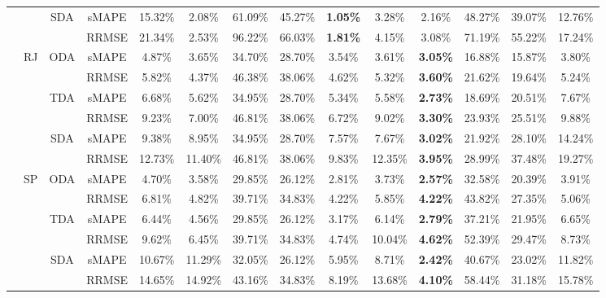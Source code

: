 {\begin{longtable}[htb!]{cccc|ccccc|ccccc}
 &  & {SDA} & sMAPE & 15.32\% & 2.08\% & 61.09\% & 45.27\% & \textbf{1.05\%} & 3.28\% & 2.16\% & 48.27\% & 39.07\% & 12.76\% \\
 &  &  & RRMSE & 21.34\% & 2.53\% & 96.22\% & 66.03\% & \textbf{1.81\%} & 4.15\% & 3.08\% & 71.19\% & 55.22\% & 17.24\% \\ \cline{2-14}
 & {RJ} & {ODA} & sMAPE & 4.87\% & 3.65\% & 34.70\% & 28.70\% & 3.54\% & 3.61\% & \textbf{3.05\%} & 16.88\% & 15.87\% & 3.80\% \\
 &  &  & RRMSE & 5.82\% & 4.37\% & 46.38\% & 38.06\% & 4.62\% & 5.32\% & \textbf{3.60\%} & 21.62\% & 19.64\% & 5.24\% \\
 &  & {TDA} & sMAPE & 6.68\% & 5.62\% & 34.95\% & 28.70\% & 5.34\% & 5.58\% & \textbf{2.73\%} & 18.69\% & 20.51\% & 7.67\% \\
 &  &  & RRMSE & 9.23\% & 7.00\% & 46.81\% & 38.06\% & 6.72\% & 9.02\% & \textbf{3.30\%} & 23.93\% & 25.51\% & 9.88\% \\
 &  & {SDA} & sMAPE & 9.38\% & 8.95\% & 34.95\% & 28.70\% & 7.57\% & 7.67\% & \textbf{3.02\%} & 21.92\% & 28.10\% & 14.24\% \\
 &  &  & RRMSE & 12.73\% & 11.40\% & 46.81\% & 38.06\% & 9.83\% & 12.35\% & \textbf{3.95\%} & 28.99\% & 37.48\% & 19.27\% \\ \cline{2-14}
 & {SP} & {ODA} & sMAPE & 4.70\% & 3.58\% & 29.85\% & 26.12\% & 2.81\% & 3.73\% & \textbf{2.57\%} & 32.58\% & 20.39\% & 3.91\% \\
 &  &  & RRMSE & 6.81\% & 4.82\% & 39.71\% & 34.83\% & 4.22\% & 5.85\% & \textbf{4.22\%} & 43.82\% & 27.35\% & 5.06\% \\
 &  & {TDA} & sMAPE & 6.44\% & 4.56\% & 29.85\% & 26.12\% & 3.17\% & 6.14\% & \textbf{2.79\%} & 37.21\% & 21.95\% & 6.65\% \\
 &  &  & RRMSE & 9.62\% & 6.45\% & 39.71\% & 34.83\% & 4.74\% & 10.04\% & \textbf{4.62\%} & 52.39\% & 29.47\% & 8.73\% \\
 &  & {SDA} & sMAPE & 10.67\% & 11.29\% & 32.05\% & 26.12\% & 5.95\% & 8.71\% & \textbf{2.42\%} & 40.67\% & 23.02\% & 11.82\% \\
 &  &  & RRMSE & 14.65\% & 14.92\% & 43.16\% & 34.83\% & 8.19\% & 13.68\% & \textbf{4.10\%} & 58.44\% & 31.18\% & 15.78\% \\ \hline
\end{longtable}
}

